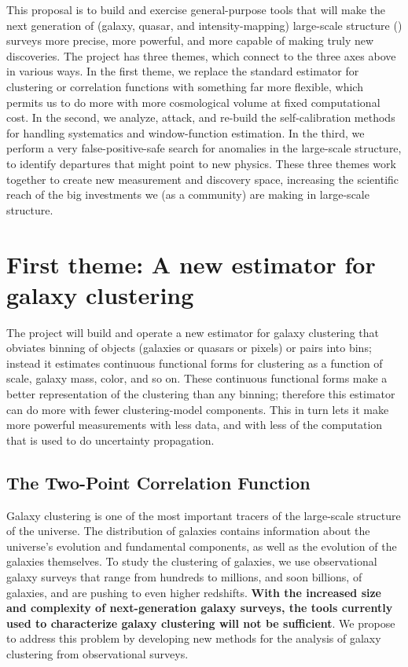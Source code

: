 \documentclass[12pt, fullpage, letterpaper]{article}
\begin{document}
This proposal is to build and exercise general-purpose tools that will
make the next generation of (galaxy, quasar, and intensity-mapping)
large-scale structure (\LSS) surveys more precise, more powerful, and
more capable of making truly new discoveries.
The project has three themes, which connect to the three axes above in
various ways.
In the first theme, we replace the standard estimator for clustering or
correlation functions with something far more flexible, which permits us
to do more with more cosmological volume at fixed computational cost.
In the second, we analyze, attack, and re-build the self-calibration 
methods for handling systematics and window-function estimation.
In the third, we perform a very false-positive-safe search for anomalies
in the large-scale structure, to identify departures that might point to
new physics.
These three themes work together to create new measurement and discovery space,
increasing the scientific reach of the big investments we (as a community)
are making in large-scale structure.

\section{First theme: A new estimator for galaxy clustering}

The project will build and operate a new estimator for
galaxy clustering that obviates binning of objects (galaxies or
quasars or pixels) or pairs into bins; instead it estimates continuous
functional forms for clustering as a function of scale, galaxy mass,
color, and so on.
These continuous functional forms make a better representation of the
clustering than any binning; therefore this estimator can do more with
fewer clustering-model components.
This in turn lets it make more powerful measurements with less data,
and with less of the computation that is used to do uncertainty
propagation.

\subsection{The Two-Point Correlation Function}

Galaxy clustering is one of the most important tracers of the large-scale structure of the universe.
The distribution of galaxies contains information about the universe's evolution and fundamental components, as well as the evolution of the galaxies themselves.
To study the clustering of galaxies, we use observational galaxy surveys that range from hundreds to millions, and soon billions, of galaxies, and are pushing to even higher redshifts.
\textbf{With the increased size and complexity of next-generation galaxy surveys, the tools currently used to characterize galaxy clustering will not be sufficient}.
We propose to address this problem by developing new methods for the analysis of galaxy clustering from observational surveys.
\end{document}

